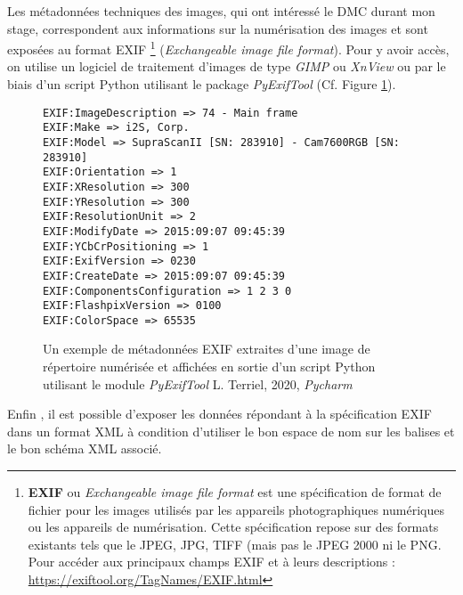 Les métadonnées techniques des images, qui ont intéressé le DMC durant mon stage, correspondent aux informations sur la numérisation des images et sont exposées au format EXIF \footnote{\textbf{EXIF} ou \textit{Exchangeable image file format} est une spécification de format de fichier pour les images utilisés par les appareils photographiques numériques ou les appareils de numérisation. Cette spécification repose sur des formats existants tels que le JPEG, JPG, TIFF (mais pas le JPEG 2000 ni le PNG. Pour accéder aux principaux champs EXIF et à leurs descriptions : \url{https://exiftool.org/TagNames/EXIF.html}} (\textit{Exchangeable image file format}). Pour y avoir accès, on utilise un logiciel de traitement d'images de type \textit{GIMP} ou \textit{XnView} ou par le biais d'un script Python utilisant le package \textit{PyExifTool} (Cf. Figure \ref{fig:sortie_exif_metadata}). 

\begin{figure}[h]
\lstset{language=Python}
\begin{lstlisting}
EXIF:ImageDescription => 74 - Main frame
EXIF:Make => i2S, Corp.
EXIF:Model => SupraScanII [SN: 283910] - Cam7600RGB [SN: 283910]
EXIF:Orientation => 1
EXIF:XResolution => 300
EXIF:YResolution => 300
EXIF:ResolutionUnit => 2
EXIF:ModifyDate => 2015:09:07 09:45:39
EXIF:YCbCrPositioning => 1
EXIF:ExifVersion => 0230
EXIF:CreateDate => 2015:09:07 09:45:39
EXIF:ComponentsConfiguration => 1 2 3 0
EXIF:FlashpixVersion => 0100
EXIF:ColorSpace => 65535
\end{lstlisting}
\caption{Un exemple de métadonnées EXIF extraites d'une image de répertoire numérisée et affichées en sortie d'un script Python utilisant le module \textit{PyExifTool}  \textcopyright L. Terriel, 2020, \textit{Pycharm}}
\label{fig:sortie_exif_metadata}
\end{figure}
\newpage
Enfin , il est possible d'exposer les données répondant à la spécification EXIF dans un format XML à condition d'utiliser le bon espace de nom sur les balises et le bon schéma XML associé.\\

